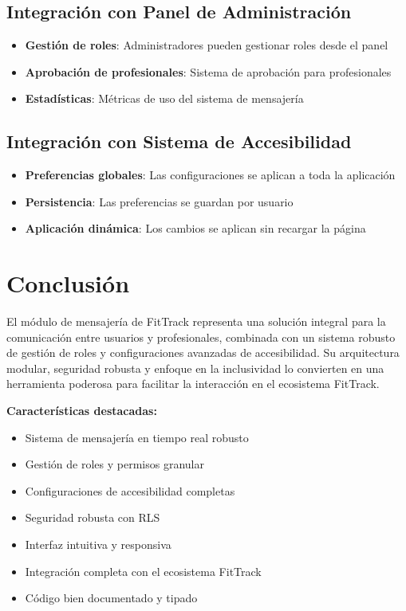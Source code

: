 \documentclass[12pt,a4paper]{article}
\begin{document}
\subsection{Integración con Panel de Administración}

\begin{itemize}
    \item \textbf{Gestión de roles}: Administradores pueden gestionar roles desde el panel
    \item \textbf{Aprobación de profesionales}: Sistema de aprobación para profesionales
    \item \textbf{Estadísticas}: Métricas de uso del sistema de mensajería
\end{itemize}

\subsection{Integración con Sistema de Accesibilidad}

\begin{itemize}
    \item \textbf{Preferencias globales}: Las configuraciones se aplican a toda la aplicación
    \item \textbf{Persistencia}: Las preferencias se guardan por usuario
    \item \textbf{Aplicación dinámica}: Los cambios se aplican sin recargar la página
\end{itemize}

\section{Conclusión}

El módulo de mensajería de FitTrack representa una solución integral para la comunicación entre usuarios y profesionales, combinada con un sistema robusto de gestión de roles y configuraciones avanzadas de accesibilidad. Su arquitectura modular, seguridad robusta y enfoque en la inclusividad lo convierten en una herramienta poderosa para facilitar la interacción en el ecosistema FitTrack.

\textbf{Características destacadas:}
\begin{itemize}
    \item Sistema de mensajería en tiempo real robusto
    \item Gestión de roles y permisos granular
    \item Configuraciones de accesibilidad completas
    \item Seguridad robusta con RLS
    \item Interfaz intuitiva y responsiva
    \item Integración completa con el ecosistema FitTrack
    \item Código bien documentado y tipado
\end{itemize}
\end{document}
